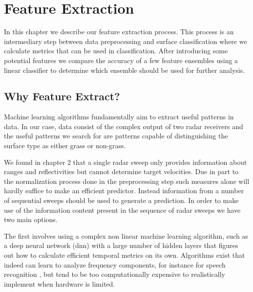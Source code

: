 
\chapter{Feature Extraction}

In this chapter we describe our feature extraction process. This process is an intermediary step between data preprocessing and surface classification where we calculate metrics that can be used in classification. After introducing some potential features we compare the accuracy of a few feature ensembles using a linear classifier to determine which ensemble should be used for further analysis.  

\section{Why Feature Extract?}

Machine learning algorithms fundamentally aim to extract useful patterns in data. In our case, data consist of the complex output of two radar receivers and the useful patterns we search for are patterns capable of distinguishing the surface type as either grass or non-grass. %

We found in chapter 2 that a single radar sweep only provides information about ranges and reflectivities but cannot determine target velocities. Due in part to the normalization process done in the preprocessing step such measures alone will hardly suffice to make an efficient predictor. Instead information from a number of sequential sweeps should be used to generate a prediction. In order to make use of the information content present in the sequence of radar sweeps we have two main options. 

The first involves using a complex non linear machine learning algorithm, such as a deep neural network (\gls{dnn}) with a large number of hidden layers that figures out how to calculate efficient temporal metrics on its own. Algorithms exist that indeed can learn to analyze frequency components, for instance for speech recognition \citep{graves_mohamed_hinton_2013}, but tend to be too computationally expensive to realistically implement when hardware is limited.

